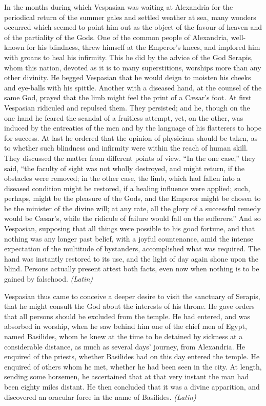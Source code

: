
In the months during which Vespasian was waiting at Alexandria for the periodical return of the summer gales and settled weather at sea, many wonders occurred which seemed to point him out as the object of the favour of heaven and of the partiality of the Gods. One of the common people of Alexandria, well-known for his blindness, threw himself at the Emperor's knees, and implored him with groans to heal his infirmity. This he did by the advice of the God Serapis, whom this nation, devoted as it is to many superstitions, worships more than any other divinity. He begged Vespasian that he would deign to moisten his cheeks and eye-balls with his spittle. Another with a diseased hand, at the counsel of the same God, prayed that the limb might feel the print of a Cæsar's foot. At first Vespasian ridiculed and repulsed them. They persisted; and he, though on the one hand he feared the scandal of a fruitless attempt, yet, on the other, was induced by the entreaties of the men and by the language of his flatterers to hope for success. At last he ordered that the opinion of physicians should be taken, as to whether such blindness and infirmity were within the reach of human skill. They discussed the matter from different points of view. ``In the one case,'' they said, ``the faculty of sight was not wholly destroyed, and might return, if the obstacles were removed; in the other case, the limb, which had fallen into a diseased condition might be restored, if a healing influence were applied; such, perhaps, might be the pleasure of the Gods, and the Emperor might be chosen to be the minister of the divine will; at any rate, all the glory of a successful remedy would be Cæsar's, while the ridicule of failure would fall on the sufferers.'' And so Vespasian, supposing that all things were possible to his good fortune, and that nothing was any longer past belief, with a joyful countenance, amid the intense expectation of the multitude of bystanders, accomplished what was required. The hand was instantly restored to its use, and the light of day again shone upon the blind. Persons actually present attest both facts, even now when nothing is to be gained by falsehood. \emph{(Latin)}


Vespasian thus came to conceive a deeper desire to visit the sanctuary of Serapis, that he might consult the God about the interests of his throne. He gave orders that all persons should be excluded from the temple. He had entered, and was absorbed in worship, when he saw behind him one of the chief men of Egypt, named Basilides, whom he knew at the time to be detained by sickness at a considerable distance, as much as several days' journey, from Alexandria. He enquired of the priests, whether Basilides had on this day entered the temple. He enquired of others whom he met, whether he had been seen in the city. At length, sending some horsemen, he ascertained that at that very instant the man had been eighty miles distant. He then concluded that it was a divine apparition, and discovered an oracular force in the name of Basilides. \emph{(Latin)}

